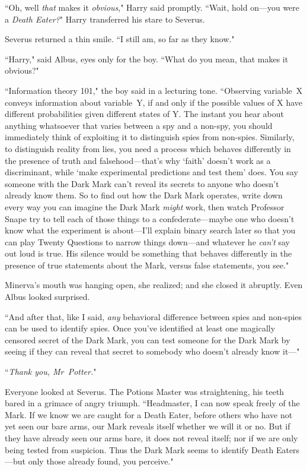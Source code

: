 ``Oh, well \emph{that} makes it \emph{obvious}," Harry said promptly. ``Wait, hold on—you were a \emph{Death Eater?}" Harry transferred his stare to Severus.

Severus returned a thin smile. ``I still am, so far as they know."

``Harry," said Albus, eyes only for the boy. ``What do you mean, that makes it obvious?"

``Information theory 101," the boy said in a lecturing tone. ``Observing variable~X conveys information about variable~Y, if and only if the possible values of X have different probabilities given different states of Y\@. The instant you hear about anything whatsoever that varies between a spy and a non-spy, you should immediately think of exploiting it to distinguish spies from non-spies. Similarly, to distinguish reality from lies, you need a process which behaves differently in the presence of truth and falsehood—that's why `faith' doesn't work as a discriminant, while `make experimental predictions and test them' does. You say someone with the Dark Mark can't reveal its secrets to anyone who doesn't already know them. So to find out how the Dark Mark operates, write down every way you can imagine the Dark Mark \emph{might} work, then watch Professor Snape try to tell each of those things to a confederate—maybe one who doesn't know what the experiment is about—I'll explain binary search later so that you can play Twenty Questions to narrow things down—and whatever he \emph{can't} say out loud is true. His silence would be something that behaves differently in the presence of true statements about the Mark, versus false statements, you see."

Minerva's mouth was hanging open, she realized; and she closed it abruptly. Even Albus looked surprised.

``And after that, like I said, \emph{any} behavioral difference between spies and non-spies can be used to identify spies. Once you've identified at least one magically censored secret of the Dark Mark, you can test someone for the Dark Mark by seeing if they can reveal that secret to somebody who doesn't already know it—"

``\emph{Thank you, Mr~Potter.}"

Everyone looked at Severus. The Potions Master was straightening, his teeth bared in a grimace of angry triumph. ``Headmaster, I can now speak freely of the Mark. If we know we are caught for a Death Eater, before others who have not yet seen our bare arms, our Mark reveals itself whether we will it or no. But if they have already seen our arms bare, it does not reveal itself; nor if we are only being tested from suspicion. Thus the Dark Mark seems to identify Death Eaters—but only those already found, you perceive."

